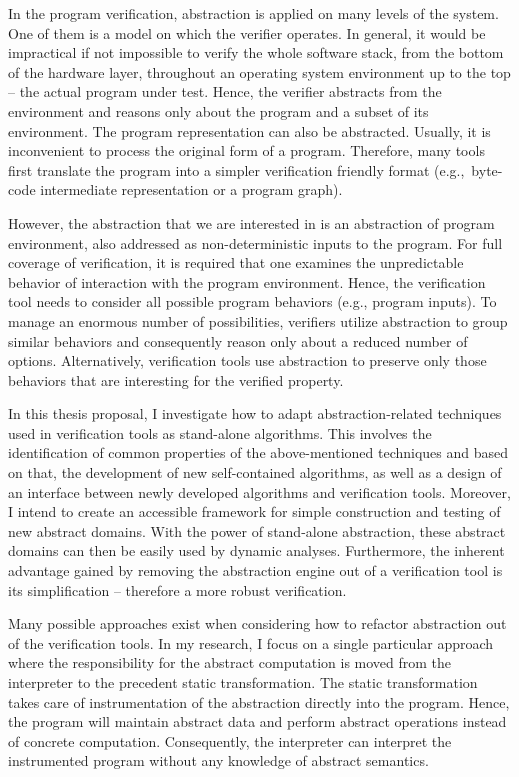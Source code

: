 In the program verification, abstraction is applied on many levels of the
system.  One of them is a model on which the verifier operates. In general, it
would be impractical if not impossible to verify the whole software stack, from
the bottom of the hardware layer, throughout an operating system environment up to
the top -- the actual program under test. Hence, the verifier abstracts from
the environment and reasons only about the program and a subset of its
environment.  The program representation can also be abstracted.  Usually, it
is inconvenient to process the original form of a program. Therefore, many
tools first translate the program into a simpler verification friendly format
(e.g.,~byte-code intermediate representation or a program graph).

However, the abstraction that we are interested in is an abstraction of
program environment, also addressed as non-deter\-mi\-ni\-stic inputs to the program.
For full coverage of verification, it is required that one examines the
unpredictable behavior of interaction with the program environment. Hence, the
verification tool needs to consider all possible program behaviors (e.g.,
program inputs).  To manage an enormous number of possibilities, verifiers
utilize abstraction to group similar behaviors and consequently reason only
about a reduced number of options. Alternatively, verification tools use
abstraction to preserve only those behaviors that are interesting for the
verified property.

In this thesis proposal, I investigate how to adapt abstraction-related
techniques used in verification tools as stand-alone algorithms. This involves
the identification of common properties of the above-mentioned techniques and
based on that, the development of new self-con\-tained algorithms, as well as a
design of an interface between newly developed algorithms and verification
tools. Moreover, I intend to create an accessible framework for simple
construction and testing of new abstract domains. With the power of stand-alone
abstraction, these abstract domains can then be easily used by dynamic
analyses. Furthermore, the inherent advantage gained by removing the
abstraction engine out of a verification tool is its simplification --
therefore a more robust verification.

Many possible approaches exist when considering how to refactor abstraction out
of the verification tools. In my research, I focus on a single particular
approach where the responsibility for the abstract computation is moved from
the interpreter to the precedent static transformation. The static
transformation takes care of instrumentation of the abstraction directly into
the program.  Hence, the program will maintain abstract data and perform
abstract operations instead of concrete computation. Conse\-quen\-tly, the
interpreter can interpret the instrumented program without any knowledge of
abstract semantics.

